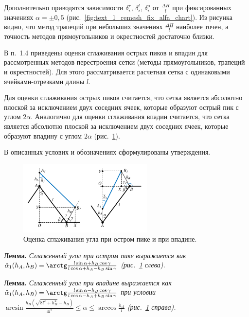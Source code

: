 \documentclass[a4paper,14pt]{extarticle}                     %
\theoremstyle{plain}                                         %
\begin{document}
Дополнительно приводятся зависимости $\delta_i^r$, $\delta_i^t$, $\delta_i^o$ от $\frac{\Delta H}{l}$ при фиксированных значениях $\alpha = \pm 0,5$ (рис.~\ref{fig:text_1_remesh_fix_alfa_chart}).
Из рисунка видно, что метод трапеций при небольших значениях $\frac{\Delta H}{l}$ наиболее точен, а точность методов прямоугольников и окрестностей достаточно близки.


В п.~1.4 приведены оценки сглаживания острых пиков и впадин для рассмотренных методов перестроения сетки (методы прямоугольников, трапеций и окрестностей).
Для этого рассматривается расчетная сетка с одинаковыми ячейками-отрезками длины $l$.

Для оценки сглаживания острых пиков считается, что сетка является абсолютно плоской за исключением двух соседних ячеек, которые образуют острый пик с углом $2 \alpha$.
Аналогично для оценки сглаживания впадин считается, что сетка является абсолютно плоской за исключением двух соседних ячеек, которые образуют впадину с углом $2 \alpha$ (рис.~\ref{fig:text_1_remesh_2d_peak_cavern_general}).

В описанных услових и обозначениях сформулированы утверждения.

\begin{figure}[ht]
\centering
\includegraphics[width=0.6\textwidth]{./pics/text_1_remesh_2d/peak-cavern-general.pdf}
\singlespacing
\caption{Оценка сглаживания угла при остром пике и при впадине.}
\label{fig:text_1_remesh_2d_peak_cavern_general}
\end{figure}

\textbf{Лемма.} \textit{Сглаженный угол при остром пике выражается как $\hat{\alpha}_1(h_A, h_B) = \arctg \frac{l \sin \alpha + h_B \cos \gamma}{l \cos \alpha + h_A - h_B \sin \gamma}$ (рис.~\ref{fig:text_1_remesh_2d_peak_cavern_general} слева).}

\textbf{Лемма.} \textit{Сглаженный угол при впадине выражается как $\check{\alpha}_1(h_A, h_B) = \arctg \frac{l \sin \alpha - h_B \cos \gamma}{l \cos \alpha - h_A + h_B \sin \gamma}$ при условии $\arcsin \frac{h_B \left( \sqrt{8 l^2 + h_B^2} - h_B \right)}{4 l^2} \le \alpha \le \arccos \frac{h_A}{l}$ (рис.~\ref{fig:text_1_remesh_2d_peak_cavern_general} справа).}
\end{document}
